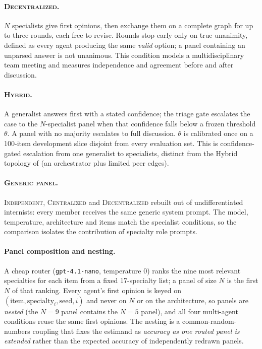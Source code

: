 \paragraph{\textsc{Decentralized}.} $N$ specialists give first opinions, then exchange them on a
complete graph for up to three rounds, each free to revise. Rounds stop early only on true
unanimity, defined as every agent producing the same \emph{valid} option; a panel containing an
unparsed answer is not unanimous. This condition models a multidisciplinary team meeting and
measures independence and agreement before and after discussion.

\paragraph{\textsc{Hybrid}.} A generalist answers first with a stated confidence; the triage
gate escalates the case to the $N$-specialist panel when that confidence falls below a frozen
threshold $\theta$. A panel with no majority escalates to full discussion. $\theta$ is calibrated
once on a 100-item development slice disjoint from every evaluation set. This is confidence-gated
escalation from one generalist to specialists, distinct from the Hybrid topology of
\citet{kim2026scaling} (an orchestrator plus limited peer edges).

\paragraph{\textsc{Generic panel}.} \textsc{Independent}, \textsc{Centralized} and
\textsc{Decentralized} rebuilt out of undifferentiated internists: every member receives the same
generic system prompt. The model, temperature, architecture and items match the specialist
conditions, so the comparison isolates the contribution of specialty role prompts.

\paragraph{Panel composition and nesting.}
\label{sec:nested} A cheap router (\texttt{gpt-4.1-nano}, temperature 0)
ranks the nine most relevant specialties for each item from a fixed 17-specialty list; a panel
of size $N$ is the first $N$ of that ranking. Every agent's first opinion is keyed on
$(\text{item}, \text{specialty}_i, \text{seed}, i)$ and never on $N$ or on the architecture, so
panels are \emph{nested} (the $N{=}9$ panel contains the $N{=}5$ panel), and all four
multi-agent conditions reuse the same first opinions. The nesting is a common-random-numbers
coupling that fixes the estimand as \emph{accuracy as one routed panel is extended} rather than
the expected accuracy of independently redrawn panels.

